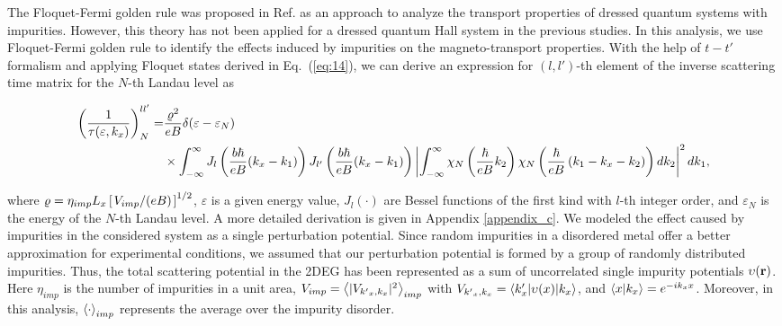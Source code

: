 
The Floquet-Fermi golden rule was proposed in Ref. \cite{wackerl20} as an approach to analyze the transport properties of dressed quantum systems with impurities.
However, this theory has not been applied for a dressed quantum Hall system in the previous studies. In this analysis, we use Floquet-Fermi golden rule to identify the effects induced by impurities on the magneto-transport properties.
With the help of $t-t'$ formalism \cite{wackerl20,grifoni98,sambe75,peskin93,althorpe97} and applying Floquet states derived in Eq.~(\ref{eq:14}), we can derive an  expression for $(l,l')$-th element of the inverse scattering time matrix for the $N$-th Landau level as
\begin{widetext}
\begin{equation} \label{eq:15}
  \begin{aligned}
    \left(\frac{1}{\tau(\varepsilon,k_x)}\right)^{ll'}_N = &
    \frac{ \varrho^2}{eB} \delta(\varepsilon - \varepsilon_N) \\
    & \times
    \int_{-\infty}^{\infty}
    J_l \bm{\left(} \frac{b\hbar}{eB}({k}_x - k_1) \bm{\right)}
    J_{l'} \bm{\left(} \frac{b\hbar}{eB}({k}_x - k_1) \bm{\right)}
    \left|
    \int_{-\infty}^{\infty}
    \chi_N \left( \frac{\hbar}{eB}k_2 \right)
    \chi_N \bm{\left(} \frac{\hbar}{eB}
    \left( k_1 - {k}_x - k_2 \right) \bm{\right)}
    dk_2 \right|^2 d k_1,
  \end{aligned}
\end{equation}
\end{widetext}
where $\varrho = \eta_{imp} L_x \left[\flatfrac{ V_{imp}}{(eB)}\right]^{1/2}$, $\varepsilon$ is a given energy value, $J_l(\cdot)$ are Bessel functions of the first kind with $l$-th integer order, and $\varepsilon_N$ is the energy of the $N$-th Landau level.
A more detailed derivation is given in Appendix \ref{appendix_c}.
We modeled the effect caused by impurities in the considered system as a single perturbation potential.
Since random impurities in a disordered metal offer a better approximation for experimental conditions, we assumed that our perturbation potential is formed by a group of randomly distributed impurities.
Thus, the total scattering potential in the 2DEG has been represented as a sum of uncorrelated single impurity potentials $\upsilon(\vb{r})$. Here $\eta_{imp}$ is the number of impurities in a unit area, $V_{imp} = \expval{|V_{{k'}_x,k_x}|^2}_{imp}$ with $V_{{k'}_x,k_x} = \mel**{k'_x}{\upsilon(x) }{k_x}$, and $\braket{x}{k_x} = e^{-ik_x x}$.
Moreover, in this analysis, $\expval{\cdot}_{imp}$ represents the average over the impurity disorder.

